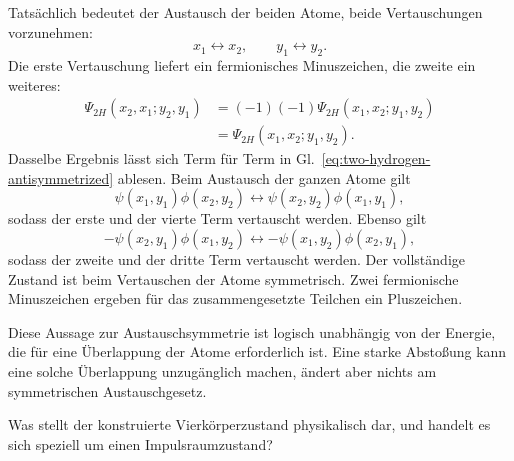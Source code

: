 \begin{classroomqa}
\end{classroomqa}

Tatsächlich bedeutet der Austausch der beiden Atome, beide Vertauschungen vorzunehmen:
\begin{equation}
x_1\leftrightarrow x_2,
\qquad
y_1\leftrightarrow y_2.
\end{equation}
Die erste Vertauschung liefert ein fermionisches Minuszeichen, die zweite ein weiteres:
\begin{equation}
\begin{aligned}
\Psi_{2H}(x_2,x_1;y_2,y_1)
&=(-1)(-1)\Psi_{2H}(x_1,x_2;y_1,y_2)\\
&=\Psi_{2H}(x_1,x_2;y_1,y_2).
\end{aligned}
\end{equation}
Dasselbe Ergebnis lässt sich Term für Term in Gl.~\eqref{eq:two-hydrogen-antisymmetrized} ablesen. Beim Austausch der ganzen Atome gilt
\begin{equation}
\psi(x_1,y_1)\phi(x_2,y_2)
\longleftrightarrow
\psi(x_2,y_2)\phi(x_1,y_1),
\end{equation}
sodass der erste und der vierte Term vertauscht werden. Ebenso gilt
\begin{equation}
-\psi(x_2,y_1)\phi(x_1,y_2)
\longleftrightarrow
-\psi(x_1,y_2)\phi(x_2,y_1),
\end{equation}
sodass der zweite und der dritte Term vertauscht werden. Der vollständige Zustand ist beim Vertauschen der Atome symmetrisch. Zwei fermionische Minuszeichen ergeben für das zusammengesetzte Teilchen ein Pluszeichen.

Diese Aussage zur Austauschsymmetrie ist logisch unabhängig von der Energie, die für eine Überlappung der Atome erforderlich ist. Eine starke Abstoßung kann eine solche Überlappung unzugänglich machen, ändert aber nichts am symmetrischen Austauschgesetz.

\begin{classroomqa}
Was stellt der konstruierte Vierkörperzustand physikalisch dar, und handelt es sich speziell um einen Impulsraumzustand?\audiencequestion{
}
\end{classroomqa}

